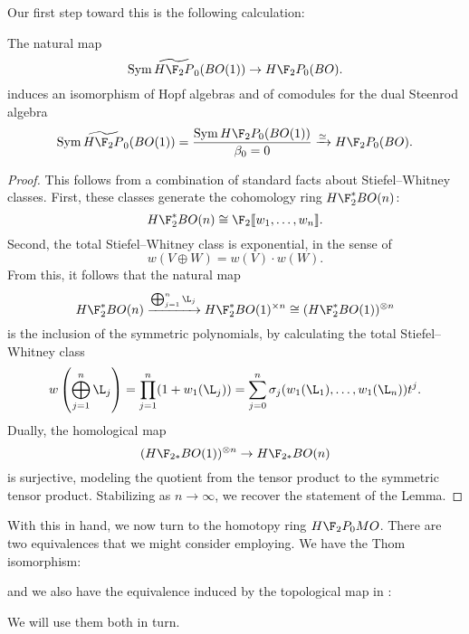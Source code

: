 Our first step toward this is the following calculation:
\begin{lemma}\label{HF2BOIsSymAlg}
The natural map \[\Sym \widetilde{H\F_2P}_0(BO(1)) \to H\F_2P_0(BO).\] induces an isomorphism of Hopf algebras and of comodules for the dual Steenrod algebra \[\Sym \widetilde{H\F_2P}_0(BO(1)) = \frac{\Sym H\F_2P_0(BO(1))}{\beta_0 = 0} \xrightarrow{\simeq} H\F_2P_0(BO).\]
\end{lemma}
\begin{proof}
This follows from a combination of standard facts about Stiefel--Whitney classes.  First, these classes generate the cohomology ring $H\F_2^* BO(n)$: \[H\F_2^* BO(n) \cong \F_2\ps{w_1, \ldots, w_n}.\]  Second, the total Stiefel--Whitney class is exponential, in the sense of \[w(V \oplus W) = w(V) \cdot w(W).\]  From this, it follows that the natural map \[H\F_2^* BO(n) \xrightarrow{\bigoplus_{j=1}^n \L_j} H\F_2^* BO(1)^{\times n} \cong (H\F_2^* BO(1))^{\otimes n}\] is the inclusion of the symmetric polynomials, by calculating the total Stiefel--Whitney class \[w\left( \bigoplus_{j=1}^n \L_j \right) = \prod_{j=1}^n (1 + w_1(\L_j)) = \sum_{j=0}^n \sigma_j(w_1(\L_1), \ldots, w_1(\L_n)) t^j.\]  Dually, the homological map \[(H\F_{2*} BO(1))^{\otimes n} \to H\F_{2*} BO(n)\] is surjective, modeling the quotient from the tensor product to the symmetric tensor product.  Stabilizing as $n \to \infty$, we recover the statement of the Lemma.
\end{proof}

With this in hand, we now turn to the homotopy ring $H\F_2P_0 MO$.  There are two equivalences that we might consider employing.  We have the Thom isomorphism:
\begin{center}
\end{center}
and we also have the equivalence induced by the topological map in :
\begin{center}
\end{center}
We will use them both in turn.

